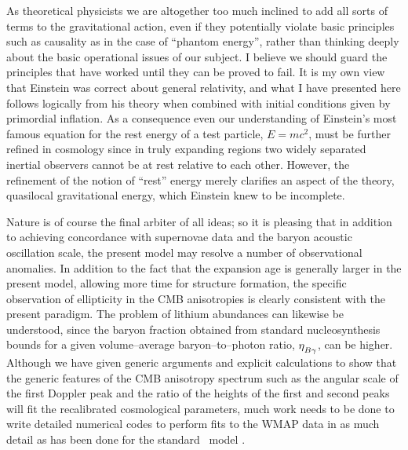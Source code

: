 \documentclass[12pt]{article}
\begin{document}
As theoretical physicists we are altogether too much inclined to
add all sorts of terms to the gravitational action, even if they potentially
violate basic principles such as causality as in the case of ``phantom
energy'', rather than thinking deeply about the basic operational issues of
our subject. I believe we should guard the principles that have worked until
they can be proved to fail. It is my own view that Einstein
was correct about general relativity, and what I have presented here
follows logically from his theory when combined with initial conditions
given by primordial inflation. As a consequence even our understanding of
Einstein's most famous equation for the rest energy of a test particle,
$E=mc^2$, must be further refined in cosmology since in truly expanding regions
two widely separated inertial observers cannot be at rest relative to each
other. However, the refinement of the notion of ``rest'' energy merely
clarifies an aspect of the theory, quasilocal gravitational energy, which
Einstein knew to be incomplete.

Nature is of course the final arbiter of all ideas; so it is pleasing
that in addition to achieving concordance with supernovae data and the baryon
acoustic oscillation scale, the present model may resolve a number of
observational anomalies.
In addition to the fact that the expansion age is generally larger in the
present model, allowing more time for structure formation, the specific
observation of ellipticity in the CMB anisotropies \cite{elliptic2,elliptic1}
is clearly consistent with the present paradigm. The problem of lithium
abundances \cite{lithium} can likewise be understood, since the baryon
fraction obtained from standard nucleosynthesis bounds for a given
volume--average baryon--to--photon ratio, $\etBg$, can be higher.
Although we have given generic arguments and explicit calculations to show
that the generic features of the CMB anisotropy spectrum such as the angular
scale of the first Doppler peak and the ratio of the heights of the first
and second peaks will fit the recalibrated cosmological parameters, much
work needs to be done to write detailed numerical codes to perform
fits to the WMAP data in as much detail as has been done for the standard
\LCDM\ model \cite{wmap}.
\end{document}
